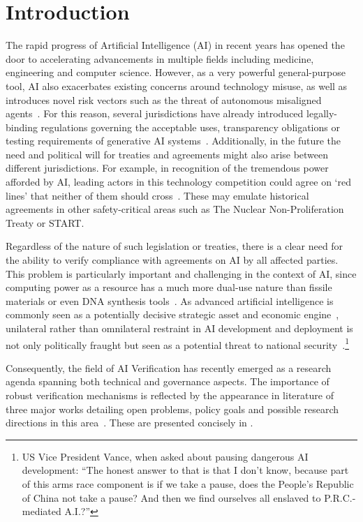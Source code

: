\documentclass{article}
\begin{document}
\section{Introduction}
\label{sec:intro}

The rapid progress of Artificial Intelligence (AI) in recent years has opened the door to accelerating advancements in multiple fields including medicine, engineering and computer science. However, as a very powerful general-purpose tool, AI also exacerbates existing concerns around technology misuse, as well as introduces novel risk vectors such as the threat of autonomous misaligned agents~\cite{bengio2026safetyreport}. For this reason, several jurisdictions have already introduced legally-binding regulations governing the acceptable uses, transparency obligations or testing requirements of generative AI systems~\cite{cac2023interim,eu2024aiact,wiener2025sb53}. Additionally, in the future the need and political will for treaties and agreements might also arise between different jurisdictions. For example, in recognition of the tremendous power afforded by AI, leading actors in this technology competition could agree on `red lines' that neither of them should cross~\cite{cesia2025redlines}. These may emulate historical agreements in other safety-critical areas such as The Nuclear Non-Proliferation Treaty or START.

Regardless of the nature of such legislation or treaties, there is a clear need for the ability to verify compliance with agreements on AI by all affected parties. This problem is particularly important and challenging in the context of AI, since computing power as a resource has a much more dual-use nature than fissile materials or even DNA synthesis tools~\cite{sastry2024compute}. As advanced artificial intelligence is commonly seen as a potentially decisive strategic asset and economic engine~\cite{nscai2021final}, unilateral rather than omnilateral restraint in AI development and deployment is not only politically fraught but seen as a potential threat to national security~\cite{petrie2025flexheg}.\footnote{US Vice President Vance, when asked about pausing dangerous AI development: ``The honest answer to that is that I don't know, because part of this arms race component is if we take a pause, does the People's Republic of China not take a pause? And then we find ourselves all enslaved to P.R.C.-mediated A.I.?''}

Consequently, the field of AI Verification has recently emerged as a research agenda spanning both technical and governance aspects. The importance of robust verification mechanisms is reflected by the appearance in literature of three major works detailing open problems, policy goals and possible research directions in this area~\cite{scher2024mechanisms,harack2025verification,baker2025verifying}. These are presented concisely in .
\end{document}
